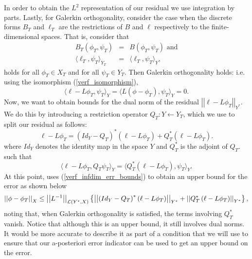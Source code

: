 \documentclass[12pt,a4paper]{article}
\theoremstyle{definition}
\begin{document}
In order to obtain the $L^2$ representation of our residual we use integration by parts.  Lastly, for Galerkin orthogonality, consider the case when the discrete forms $B_T$ and $\ell_T$ are the restrictions of $B$ and $\ell$ respectively to the finite-dimensional spaces.  That is, consider that
\begin{eqnarray}
B_T\left(\phi_T,\psi_T\right)&=&B\left(\phi_T,\psi_T\right)\text{ and}\\
\langle \ell_T, \psi_T\rangle_{Y_T} &=& \langle \ell_T, \psi_T\rangle_{Y},
\end{eqnarray}
holds for all $\phi_T\in X_T$ and for all $\psi_T \in Y_T$.  Then Galerkin orthogonality holds: i.e. using the isomorphism (\ref{verf_isomorphism}),
\begin{equation}
\langle \ell -L\phi_T,\psi_T\rangle_{Y}=\langle L\left(\phi-\phi_T\right),\psi_T\rangle_{Y}=0.
\end{equation}
Now, we want to obtain bounds for the dual norm of the residual $\left|\left|\ell-L\phi_T\right|\right|_{Y^*}$.  We do this by introducing a restriction operator $Q_T:Y\leftarrow Y_T$, which we use to split our residual as follows:
\begin{equation}\label{verf_residual_split}
\ell-L\phi_T=\left(Id_Y-Q_T\right)^*\left(\ell-L\phi_T\right)+Q_T^*\left(\ell-L\phi_T\right).
\end{equation}
where $Id_Y$ denotes the identity map in the space $Y$ and $Q_T^*$ is the adjoint of $Q_T$. such that 
\begin{equation}
\langle \ell -L\phi_T, Q_T\psi_T\rangle_Y = \langle Q_T^*\left(\ell -L\phi_T\right), \psi_T\rangle_Y. 
\end{equation}  
At this point, \cite{verfurth2013posteriori} uses (\ref{verf_infdim_err_bounds}) to obtain an upper bound for the error as shown below
\begin{equation}\small
\left|\left|\phi-\phi_T\right|\right|_X\leq \left|\left|L^{-1}\right|\right|_{\mathcal{L}\left(Y^*,X\right)}\left\lbrace\left|\left| \left(Id_Y-Q_T\right)^*\left(\ell-L\phi_T\right)\right|\right|_{Y^*} +\left|\left| Q_T^*\left(\ell-L\phi_T\right)\right|\right|_{Y^*}\right\rbrace,
\end{equation}
noting that, when Galerkin orthogonality is satisfied, the terms involving $Q_T^*$ vanish.  Notice that although this is an upper bound, it still involves dual norms.  It would be more accurate to describe it as part of a condition that we will use to ensure that our a-posteriori error indicator can be used to get an upper bound on the error.
\end{document}
